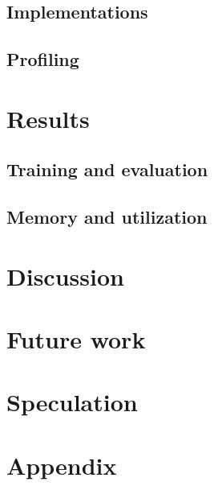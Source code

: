 \documentclass[sigconf]{acmart}
\begin{document}
\subsection{Implementations}\label{subsec:implementations}

\subsection{Profiling}\label{subsec:profiling}

\section{Results}\label{sec:approach}

\subsection{Training and evaluation}\label{subsec:training-and-evaluation}

\subsection{Memory and utilization}\label{subsec:memory-and-utilization}

\section{Discussion}\label{sec:results}

\section{Future work}\label{sec:discussion}
\section{Speculation}\label{sec:speculation}




\appendix
\appendixpage
\addappheadtotoc

\section{Appendix}\label{sec:appendix}


\end{document}
